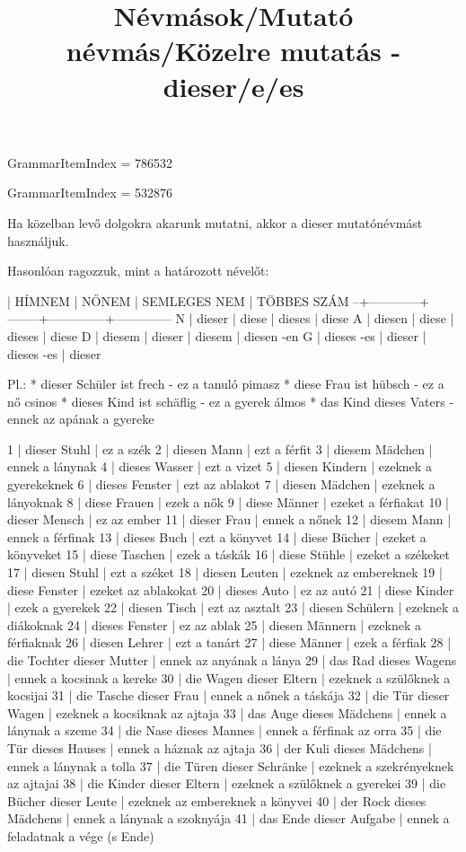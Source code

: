 GrammarItemIndex = 786532

\begin{desc}
\end{desc}

\begin{exmp}
\end{exmp}

\title{Névmások/Mutató névmás/Közelre mutatás - dieser/e/es}

GrammarItemIndex = 532876

\begin{desc}
Ha közelban levő dolgokra akarunk mutatni, akkor a dieser mutatónévmást használjuk.

Hasonlóan ragozzuk, mint a határozott névelőt:

  | HÍMNEM     | NŐNEM  | SEMLEGES NEM | TÖBBES SZÁM
--+------------+--------+--------------+--------------
N | dieser     | diese  | dieses       | diese
A | diesen     | diese  | dieses       | diese
D | diesem     | dieser | diesem       | diesen -en
G | dieses -es | dieser | dieses -es   | dieser

Pl.: * dieser Schüler ist frech - ez a tanuló pimasz
* diese Frau ist hübsch - ez a nő csinos
* dieses Kind ist schäflig - ez a gyerek álmos
* das Kind dieses Vaters - ennek az apának a gyereke
\end{desc}

\begin{exmp}
1 | dieser Stuhl | ez a szék
2 | diesen Mann | ezt a férfit
3 | diesem Mädchen | ennek a lánynak
4 | dieses Wasser | ezt a vizet
5 | diesen Kindern | ezeknek a gyerekeknek
6 | dieses Fenster | ezt az ablakot
7 | diesen Mädchen | ezeknek a lányoknak
8 | diese Frauen | ezek a nők
9 | diese Männer | ezeket a férfiakat
10 | dieser Mensch | ez az ember
11 | dieser Frau | ennek a nőnek
12 | diesem Mann | ennek a férfinak
13 | dieses Buch | ezt a könyvet
14 | diese Bücher | ezeket a könyveket
15 | diese Taschen | ezek a táskák
16 | diese Stühle | ezeket a székeket
17 | diesen Stuhl | ezt a széket
18 | diesen Leuten | ezeknek az embereknek
19 | diese Fenster | ezeket az ablakokat
20 | dieses Auto | ez az autó
21 | diese Kinder | ezek a gyerekek
22 | diesen Tisch | ezt az asztalt
23 | diesen Schülern | ezeknek a diákoknak
24 | dieses Fenster | ez az ablak
25 | diesen Männern | ezeknek a férfiaknak
26 | diesen Lehrer | ezt a tanárt
27 | diese Männer | ezek a férfiak
28 | die Tochter dieser Mutter | ennek az anyának a lánya
29 | das Rad dieses Wagens | ennek a kocsinak a kereke
30 | die Wagen dieser Eltern | ezeknek a szülőknek a kocsijai
31 | die Tasche dieser Frau | ennek a nőnek a táskája
32 | die Tür dieser Wagen | ezeknek a kocsiknak az ajtaja
33 | das Auge dieses Mädchens | ennek a lánynak a szeme
34 | die Nase dieses Mannes | ennek a férfinak az orra
35 | die Tür dieses Hauses | ennek a háznak az ajtaja
36 | der Kuli dieses Mädchens | ennek a lánynak a tolla
37 | die Türen dieser Schränke | ezeknek a szekrényeknek az ajtajai
38 | die Kinder dieser Eltern | ezeknek a szülőknek a gyerekei
39 | die Bücher dieser Leute | ezeknek az embereknek a könyvei
40 | der Rock dieses Mädchens | ennek a lánynak a szoknyája
41 | das Ende dieser Aufgabe | ennek a feladatnak a vége (s Ende)
\end{exmp}

